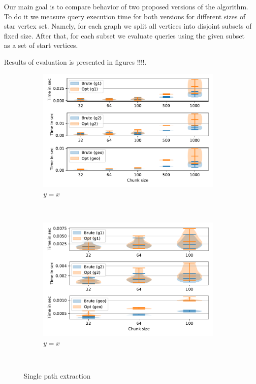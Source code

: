 Our main goal is to compare behavior of two proposed versions of the algorithm.
To do it we measure query execution time for both versions for different sizes of star vertex set. 
Namely, for each graph we split all vertices into disjoint subsets of fixed size.
After that, for each subset we evaluate queries using the given subset as a set of start vertices. 

Results of evaluation is presented in figures !!!!.
\begin{figure}
     \begin{subfigure}[b]{0.24\textwidth}
         \centering
         \includegraphics[width=\textwidth]{data/raw/core.pdf}
         \caption{$y=x$}
         \label{fig:y equals x}
     \end{subfigure}
     ~\begin{subfigure}[b]{0.24\textwidth}
         \centering
         \includegraphics[width=\textwidth]{data/raw/core_3.pdf}
         \caption{$y=x$}
         \label{fig:y equals x}
     \end{subfigure}\\
   \caption{Single path extraction}
\end{figure}


